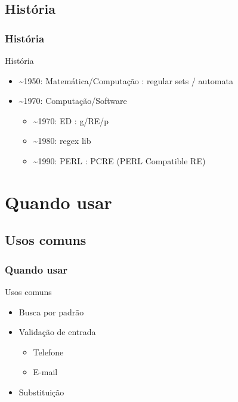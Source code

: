 \documentclass{beamer}
\begin{document}
\subsection{História}
\begin{frame}
 \frametitle{História}
 \begin{block}{História}
  \begin{itemize}
   \item \~{}1950: Matemática/Computação : regular sets / automata
	\pause
   \item \~{}1970: Computação/Software
	\begin{itemize}
	 \item \~{}1970: ED \pause: g/RE/p
	  \pause
	 \item \~{}1980: regex lib
	  \pause
	 \item \~{}1990: PERL \pause: PCRE (PERL Compatible RE)
	\end{itemize}
  \end{itemize}
 \end{block}
\end{frame}

\section{Quando usar}
\subsection{Usos comuns}
\begin{frame}
 \frametitle{Quando usar}
 \begin{block}{Usos comuns}
  \begin{itemize}
   \item Busca por padrão
	\pause
   \item Validação de entrada
	\begin{itemize}
	 \item Telefone
	 \item E-mail
	\end{itemize}
	\pause
   \item Substituição
  \end{itemize}
 \end{block}
\end{frame}
\end{document}
